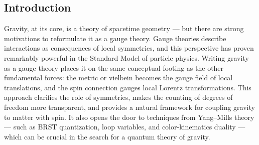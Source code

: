 \documentclass[a0,portrait]{a0poster}
\begin{document}
\begin{multicols}{2} %








\section*{Introduction}

Gravity, at its core, is a theory of spacetime geometry --- 
but there are strong motivations to reformulate it as a gauge theory. 
Gauge theories describe interactions as consequences of local symmetries, 
and this perspective has proven remarkably powerful in the Standard Model of 
particle physics. Writing gravity as a gauge theory places it on the same 
conceptual footing as the other fundamental forces: the metric or 
vielbein becomes the gauge field of local translations, and the spin 
connection gauges local Lorentz transformations. This approach 
clarifies the role of symmetries, makes the counting of degrees 
of freedom more transparent, and provides a natural framework for 
coupling gravity to matter with spin. It also opens the door to 
techniques from Yang–Mills theory --- such as BRST 
quantization, loop variables, and color-kinematics duality --- 
which can be crucial in the search for a quantum theory of gravity.




\end{multicols}
\end{document}
